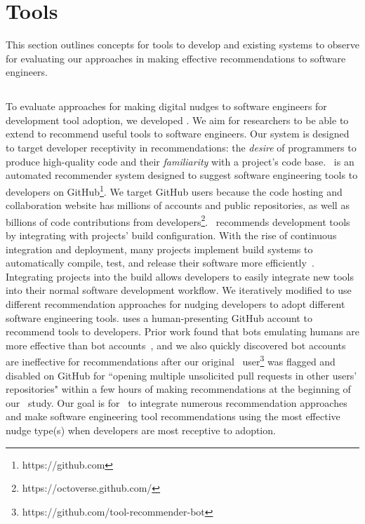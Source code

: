 \section{Tools}

This section outlines concepts for tools to develop and existing systems to observe for evaluating our approaches in making effective recommendations to software engineers.

\subsection{\TOOL}



To evaluate approaches for making digital nudges to software engineers for development tool adoption, we developed \TOOL. We aim for researchers to be able to extend \TOOL to recommend useful tools to software engineers. Our system is designed to target developer receptivity in recommendations: the \textit{desire} of programmers to produce high-quality code and their \textit{familiarity} with a project's code base. \TOOL~is an automated recommender system designed to suggest software engineering tools to developers on GitHub\footnote{https://github.com}. We target GitHub users because the code hosting and collaboration website has millions of accounts and public repositories, as well as billions of code contributions from developers\footnote{https://octoverse.github.com/}. \TOOL~recommends development tools by integrating with projects' build configuration. With the rise of continuous integration and deployment, many projects implement build systems to automatically compile, test, and release their software more efficiently~\cite{AkondDeployment}. Integrating projects into the build allows developers to easily integrate new tools into their normal software development workflow. We iteratively modified \TOOL to use different recommendation approaches for nudging developers to adopt different software engineering tools. \TOOL uses a human-presenting GitHub account to recommend tools to developers. Prior work found that bots emulating humans are more effective than bot accounts~\cite{AmongTheMachines}, and we also quickly discovered bot accounts are ineffective for recommendations after our original \TOOL~user\footnote{https://github.com/tool-recommender-bot} was flagged and disabled on GitHub for ``opening multiple unsolicited pull requests in other users' repositories" within a few hours of making recommendations at the beginning of our \tele~study. Our goal is for \TOOL~to integrate numerous recommendation approaches and make software engineering tool recommendations using the most effective nudge type(s) when developers are most receptive to adoption.

